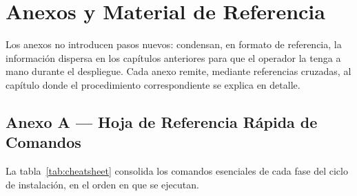 \chapter[Anexos y Material de Referencia]{Anexos y Material de Referencia}%
\label{ch:anexos}

Los anexos no introducen pasos nuevos: condensan, en formato de referencia, la información
dispersa en los capítulos anteriores para que el operador la tenga a mano durante el
despliegue. Cada anexo remite, mediante referencias cruzadas, al capítulo donde el
procedimiento correspondiente se explica en detalle.\par

\section{Anexo A — Hoja de Referencia Rápida de Comandos}%
\label{sec:anexo-comandos}

La tabla~\ref{tab:cheatsheet} consolida los comandos esenciales de cada fase del ciclo de
instalación, en el orden en que se ejecutan.\par

